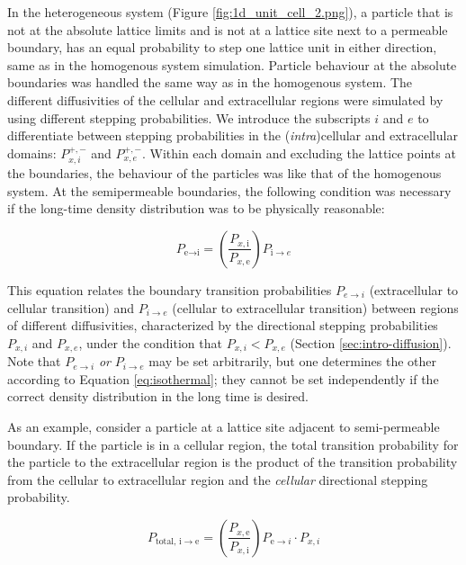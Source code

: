 	In the heterogeneous system (Figure \ref{fig:1d_unit_cell_2.png}), a particle that is not at the absolute lattice limits and is not at a lattice site next to a permeable boundary, has an equal probability to step one lattice unit in either direction, same as in the homogenous system simulation. Particle behaviour at the absolute boundaries was handled the same way as in the homogenous system. The different diffusivities of the cellular and extracellular regions were simulated by using different stepping probabilities. We introduce the subscripts $ i $ and $ e $ to differentiate between stepping probabilities in the (\textsl{intra})cellular and extracellular domains: $ P_{x,i}^{+,-} $ and $ P_{x,e}^{+,-} $. Within each domain and excluding the lattice points at the boundaries, the behaviour of the particles was like that of the homogenous system. At the semipermeable boundaries, the following condition was necessary if the long-time density distribution was to be physically reasonable:
	
	\begin{equation}
		\label{eq:isothermal}
		P_{\textrm{e}\rightarrow \textrm{i}} = \left( \dfrac{P_{x,\textrm{i}}}{P_{x,\textrm{e}}}\right)  P_{\textrm{i}\rightarrow e}
	\end{equation}
	
	This equation relates the boundary transition probabilities $ P_{e \rightarrow i} $ (extracellular to cellular transition) and $ P_{i \rightarrow e} $ (cellular to extracellular transition) between regions of different diffusivities, characterized by the directional stepping probabilities $ P_{x,i} $ and $ P_{x,e} $, under the condition that $ P_{x,i} < P_{x,e} $ (Section \ref{sec:intro-diffusion}). Note that $ P_{e \rightarrow i} $ \textsl{or} $ P_{i \rightarrow e} $ may be set arbitrarily, but one determines the other according to Equation \ref{eq:isothermal}; they cannot be set independently if the correct density distribution in the long time is desired. 
	
	As an example, consider a particle at a lattice site adjacent to semi-permeable boundary. If the particle is in a cellular region, the total transition probability for the particle to the extracellular region is the product of the transition probability from the cellular to extracellular region and the \textsl{cellular} directional stepping probability.
	
	\begin{equation}
		P_{\textrm{total},\, \textrm{i} \rightarrow \textrm{e}} = \left( \dfrac{P_{x,\textrm{e}}}{P_{x,\textrm{i}}}\right)  P_{\textrm{e}\rightarrow i} \cdot P_{x,i}
	\end{equation}
	

